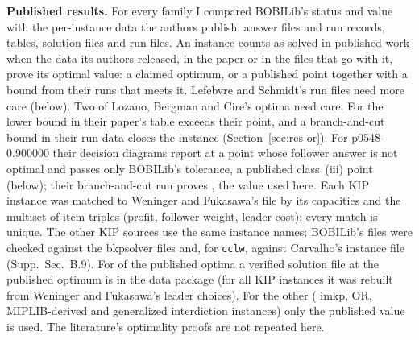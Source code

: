 \documentclass[]{spie}  %
\theoremstyle{plain}
\newcommand{\supp}[1]{Supp.\ Sec.~#1}
\newcommand{\code}[1]{\texttt{#1}}
\newcommand{\inst}[1]{\mbox{#1}}             %
\newcommand{\cls}[1]{class~(#1)}             %
\begin{document}
\textbf{Published results.} For every family I compared BOBILib's status and value with the
per-instance data the authors publish: answer files and run records,\cite{weninger_bkpsolver}
tables, solution files\cite{lozano_dbo_repo} and run files.\cite{lefebvre2025dantzig} An
instance counts as solved in published work when the data its authors released, in the paper or in
the files that go with it, prove its optimal value: a claimed optimum, or a published point together
with a bound from their runs that meets it. Lefebvre and Schmidt's run files need more care
(below). Two of Lozano, Bergman and Cire's optima need
care. For \inst{\OrClosureName} the lower bound in their paper's table exceeds their point, and a
branch-and-cut bound in their run data closes the instance (Section~\ref{sec:res-or}). For
\inst{p0548-0.900000} their decision diagrams report \PFiveFortyEightDd{} at a point whose follower answer is not
optimal and passes only BOBILib's tolerance, a published \cls{iii} point (below);
their branch-and-cut run proves \PFiveFortyEightOptimum{}, the value used here. Each KIP instance was
matched to Weninger and Fukasawa's file by its capacities and the
multiset of item triples (profit, follower weight, leader cost); every match is unique. The other
KIP sources use the same instance names; BOBILib's files were checked against the bkpsolver files and,
for \code{cclw}, against Carvalho's instance file (\supp{B.9}). For
\NumLitWithFile{} of the \NumLitOptimal{} published optima a verified solution file at the
published optimum is in the data package (for all \NumLitKip{} KIP instances it was rebuilt from
Weninger and Fukasawa's leader choices). For the other \NumLitNoFile{} (\NumLitNoFileImkp{} imkp,
\NumLitNoFileOr{} OR, \NumLitNoFileMiplib{} MIPLIB-derived and \NumLitNoFileGeneralized{}
generalized interdiction instances) only the published value is used. The literature's
optimality proofs are not repeated here.
\end{document}
